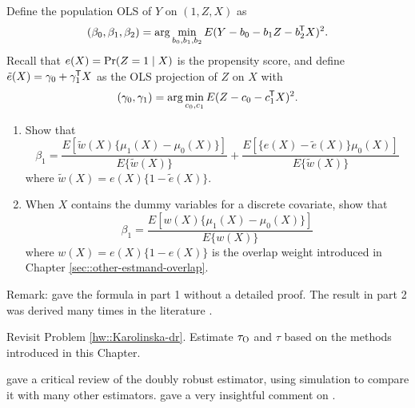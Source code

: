 \begin{HomeworkProblem}\label{exr:14-4}




Define the population OLS of $Y$ on $ (1, Z, X) $ as
\[
(\beta_0, \beta_1, \beta_2) = \arg\min_{b_0, b_1, b_2}   E(Y - b_0 - b_1 Z - b_2^{\mkern-1.5mu\mathsf{T}} X)^2.
\]
Recall that $e(X) = \operatorname{Pr}(Z=1\mid X)$ is the propensity score, and define $\tilde{e}(X) = \gamma_0+\gamma_1^{\mkern-1.5mu\mathsf{T}} X$ as the OLS projection of $Z$ on $X$ with%
\[
(\gamma_0, \gamma_1) =  \arg\min_{c_0, c_1}   E(Z - c_0 -  c_1^{\mkern-1.5mu\mathsf{T}} X)^2.
\]

\begin{enumerate}
\item
Show that
\[
\beta_1 = \frac{    E [  \tilde{w}(X) \{ \mu_1(X) - \mu_0(X) \} ]  }{   E \{ \tilde{w}(X) \} }
+ \frac{  E [  \{  e(X) - \tilde{e}(X)  \}  \mu_0(X)  ] }{  E \{ \tilde{w}(X) \}  }
\]
where $\tilde{w}(X) = e(X)\{ 1 - \tilde{e}(X)  \}$.

\item
When $X$ contains the dummy variables for a discrete covariate, show that
\[
\beta_1 = \frac{    E [  w(X) \{ \mu_1(X) - \mu_0(X) \} ]  }{   E \{ w(X) \} }
\]
where $w(X) = e(X)\{ 1 - e(X)  \}$ is the overlap weight introduced in Chapter \ref{sec::other-estmand-overlap}.

\end{enumerate}


Remark: \citet{vansteelandt2021assumption} gave the formula in part 1 without a detailed proof. The result in part 2 was derived many times in the literature \citep[e.g.,][]{angrist1998estimating, ding2021frisch}.


\end{HomeworkProblem}

\begin{HomeworkProblem}\label{exr:14-5}

Revisit Problem \ref{hw::Karolinska-dr}. Estimate $\tau_\textsc{O}$ and $\tau$ based on the methods introduced in this Chapter.






\end{HomeworkProblem}

\begin{HomeworkProblem}\label{exr:14-6}
\citet{kang2007demystifying} gave a critical review of the doubly robust estimator, using simulation to compare it with many other estimators. \citet{robins2007comment} gave a very insightful comment on \citet{kang2007demystifying}.





\end{HomeworkProblem}
